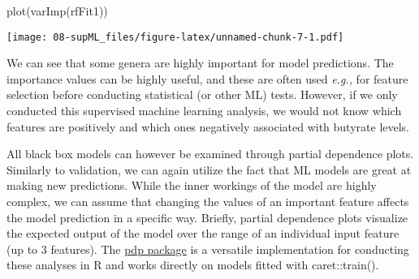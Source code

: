 \documentclass[
  oneside]{book}
\newenvironment{Shaded}{\begin{snugshade}}{\end{snugshade}}
\newcommand{\FunctionTok}[1]{\textcolor[rgb]{0.00,0.00,0.00}{#1}}
\newcommand{\NormalTok}[1]{#1}
\begin{document}
\begin{Shaded}
\begin{Highlighting}[]
\FunctionTok{plot}\NormalTok{(}\FunctionTok{varImp}\NormalTok{(rfFit1))}
\end{Highlighting}
\end{Shaded}

\texttt{[image: 08-supML\_files/figure-latex/unnamed-chunk-7-1.pdf]}

We can see that some genera are highly important for model predictions. The importance
values can be highly useful, and these are often used \emph{e.g.,} for feature selection before
conducting statistical (or other ML) tests. However, if we only conducted this supervised
machine learning analysis, we would not know which features are positively and which
ones negatively associated with butyrate levels.

All black box models can however be examined through partial dependence plots. Similarly to
validation, we can again utilize the fact that ML models are great at making new predictions.
While the inner workings of the model are highly complex, we can assume that changing
the values of an important feature affects the model prediction in a specific way.
Briefly, partial dependence plots visualize the expected output of the model over the
range of an individual input feature (up to 3 features). The \href{https://bgreenwell.github.io/pdp/articles/pdp.html}{pdp package}
is a versatile implementation for conducting these analyses in R and works directly on models
fitted with caret::train().
\end{document}
